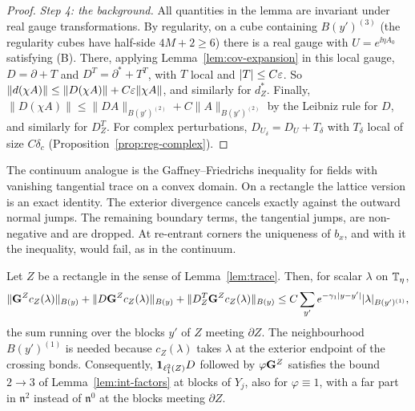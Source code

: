 \begin{proof}
\emph{Step 4: the background.} All quantities in the lemma are invariant under real gauge transformations. By regularity, on a cube containing $B(y')^{(3)}$ (the regularity cubes have half-side $4M+2\ge6$) there is a real gauge with $U=e^{\ii\eta A_0}$ satisfying (B). There, applying Lemma~\ref{lem:cov-expansion} in this local gauge, $D=\partial+T$ and $D^T=\partial^*+T^T$, with $T$ local and $|T|\le C\varepsilon$. So $\|d(\chi A)\|\le\|D(\chi A)\|+C\varepsilon\|\chi A\|$, and similarly for $d^*_Z$. Finally, $\|D(\chi A)\|\le\|DA\|_{B(y')^{(2)}}+C\|A\|_{B(y')^{(2)}}$ by the Leibniz rule for $D$, and similarly for $D^T_Z$. For complex perturbations, $D_{U_\delta}=D_U+T_\delta$ with $T_\delta$ local of size $C\delta_c$ (Proposition~\ref{prop:reg-complex}).
\end{proof}

The continuum analogue is the Gaffney--Friedrichs inequality for fields with vanishing tangential trace on a convex domain. On a rectangle the lattice version is an exact identity. The exterior divergence cancels exactly against the outward normal jumps. The remaining boundary terms, the tangential jumps, are non-negative and are dropped. At re-entrant corners the uniqueness of $b_x$, and with it the inequality, would fail, as in the continuum.

\begin{lemma}\label{lem:cut-term}
Let $Z$ be a rectangle in the sense of Lemma~\ref{lem:trace}. Then, for scalar $\lambda$ on $\mathbb T_\eta$,
\[
\|\mathbf G^{Z}c_Z(\lambda)\|_{B(y)}+\|D\mathbf G^{Z}c_Z(\lambda)\|_{B(y)}+\|D^T_Z\mathbf G^Zc_Z(\lambda)\|_{B(y)}\le C\sum_{y'}e^{-\gamma_1|y-y'|}|\lambda|_{B(y')^{(1)}},
\]
the sum running over the blocks $y'$ of $Z$ meeting $\partial Z$. The neighbourhood $B(y')^{(1)}$ is needed because $c_Z(\lambda)$ takes $\lambda$ at the exterior endpoint of the crossing bonds. Consequently, $\mathbf 1_{\ell^2_1(Z)}D$ followed by $\varphi\mathbf G^Z$ satisfies the bound $2\to3$ of Lemma~\ref{lem:int-factors} at blocks of $Y_j$, also for $\varphi\equiv1$, with a far part in $\mathfrak n^2$ instead of $\mathfrak n^0$ at the blocks meeting $\partial Z$.
\end{lemma}

